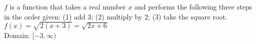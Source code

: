 {$f$ is a function that takes a real number $x$ and performs the following three steps in the order given: (1) add 3; (2) multiply by 2; (3) take the square root.
}
{$f(x) = \sqrt{2(x+3)} = \sqrt{2x+6}$ \\ Domain: $[-3, \infty)$
 }